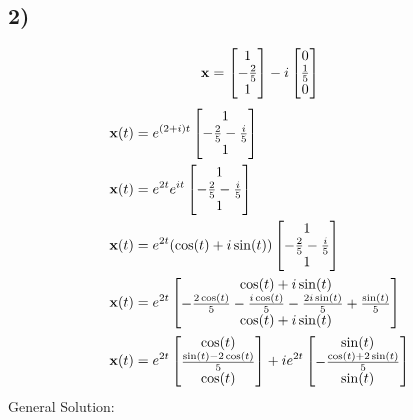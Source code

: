 \documentclass{article}
\begin{document}
\subsection{2)}

\begin{equation*}
	\mathbf{x} = \begin{bmatrix} 1 \\ -\frac{2}{5} \\ 1 \end{bmatrix} - i \begin{bmatrix} 0 \\ \frac{1}{5} \\ 0 \end{bmatrix}
\end{equation*}
\begin{align*}
	\mathbf{x}(t) & = e^{(2 + i)t} \begin{bmatrix} 1 \\ -\frac{2}{5} - \frac{i}{5} \\ 1 \end{bmatrix} \\
	\mathbf{x}(t) & = e^{2t}e^{it} \begin{bmatrix} 1 \\ -\frac{2}{5} - \frac{i}{5} \\ 1 \end{bmatrix} \\
	\mathbf{x}(t) & = e^{2t}(\cos(t) + i\sin(t)) \begin{bmatrix} 1 \\ -\frac{2}{5} - \frac{i}{5} \\ 1 \end{bmatrix} \\
	\mathbf{x}(t) & = e^{2t}
		\begin{bmatrix}
			\cos(t) + i\sin(t) \\
			-\frac{2\cos(t)}{5} - \frac{i\cos(t)}{5} - \frac{2i\sin(t)}{5} + \frac{\sin(t)}{5} \\
			\cos(t) + i\sin(t)
		\end{bmatrix} \\
	\mathbf{x}(t) & = e^{2t}
		\begin{bmatrix}
			\cos(t) \\
			\frac{\sin(t) - 2\cos(t)}{5} \\
			\cos(t)
		\end{bmatrix}
		+ ie^{2t}
		\begin{bmatrix}
			\sin(t) \\
			-\frac{\cos(t) + 2\sin(t)}{5} \\
			\sin(t)
		\end{bmatrix}
\end{align*}
General Solution:
\end{document}
